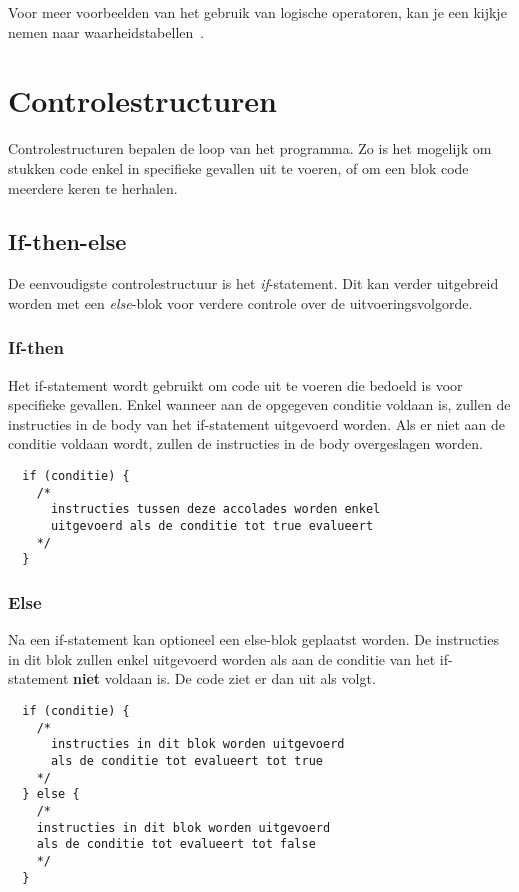 \documentclass[11pt,fleqn]{book} %
\begin{document}
\noindent Voor meer voorbeelden van het gebruik van logische operatoren, kan je een kijkje nemen naar waarheidstabellen~\cite{wiki:Waarheidstabel}.


\chapter{Controlestructuren}
Controlestructuren bepalen de loop van het programma. Zo is het mogelijk om stukken code enkel in specifieke gevallen uit te voeren, of om een blok code meerdere keren te herhalen.
\section{If-then-else}
De eenvoudigste controlestructuur is het \emph{if}-statement. Dit kan verder uitgebreid worden met een \emph{else}-blok voor verdere controle over de uitvoeringsvolgorde.

\subsection{If-then}
Het if-statement wordt gebruikt om code uit te voeren die bedoeld is voor specifieke gevallen. Enkel wanneer aan de opgegeven conditie voldaan is, zullen de instructies in de body van het if-statement uitgevoerd worden. Als er niet aan de conditie voldaan wordt, zullen de instructies in de body overgeslagen worden.

\begin{definition}[If]
	\phantom{ }
	\begin{verbatim}
  if (conditie) {
    /*
      instructies tussen deze accolades worden enkel 
      uitgevoerd als de conditie tot true evalueert
    */
  }
	\end{verbatim}
	\vspace{0cm}
\end{definition}

\pagebreak

\subsection{Else}
Na een if-statement kan optioneel een else-blok geplaatst worden. De instructies in dit blok zullen enkel uitgevoerd worden als aan de conditie van het if-statement \textbf{niet} voldaan is. De code ziet er dan uit als volgt.

\begin{definition}
	\phantom{ }
	\begin{verbatim}
  if (conditie) {
    /*
      instructies in dit blok worden uitgevoerd 
      als de conditie tot evalueert tot true
    */
  } else {
    /*
    instructies in dit blok worden uitgevoerd 
    als de conditie tot evalueert tot false
    */
  }
	\end{verbatim}
\end{definition}
\end{document}
